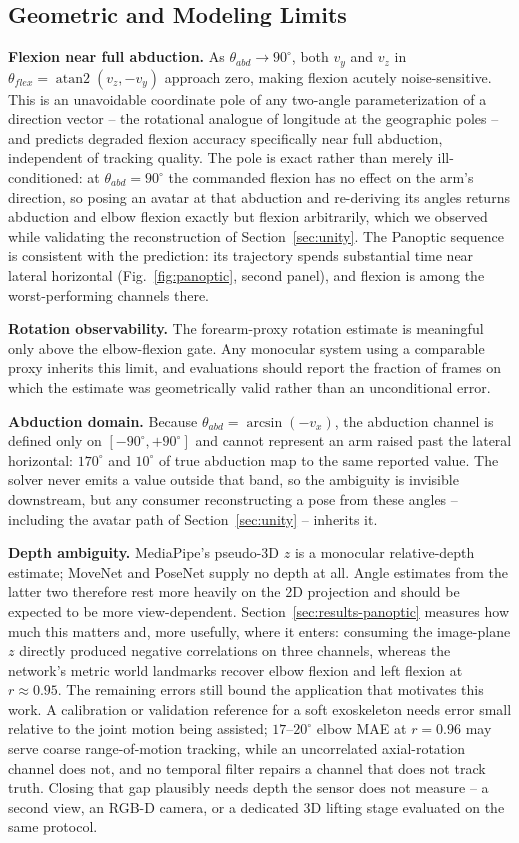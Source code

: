 \documentclass[conference]{IEEEtran}
\begin{document}
\subsection{Geometric and Modeling Limits}
\textbf{Flexion near full abduction.} As $\theta_{abd}\to90^\circ$, both
$v_y$ and $v_z$ in $\theta_{flex}=\operatorname{atan2}(v_z,-v_y)$
approach zero, making flexion acutely noise-sensitive. This is an
unavoidable coordinate pole of any two-angle parameterization of a
direction vector -- the rotational analogue of longitude at the
geographic poles -- and predicts degraded flexion accuracy specifically
near full abduction, independent of tracking quality. The pole is exact
rather than merely ill-conditioned: at $\theta_{abd}=90^\circ$ the
commanded flexion has no effect on the arm's direction, so posing an
avatar at that abduction and re-deriving its angles returns abduction and
elbow flexion exactly but flexion arbitrarily, which we observed while
validating the reconstruction of Section~\ref{sec:unity}. The Panoptic
sequence is consistent with the prediction: its trajectory spends
substantial time near lateral horizontal
(Fig.~\ref{fig:panoptic}, second panel), and flexion is among the
worst-performing channels there.

\textbf{Rotation observability.} The forearm-proxy rotation estimate is
meaningful only above the elbow-flexion gate. Any monocular system using
a comparable proxy inherits this limit, and evaluations should report the
fraction of frames on which the estimate was geometrically valid rather
than an unconditional error.

\textbf{Abduction domain.} Because $\theta_{abd}=\arcsin(-v_x)$, the
abduction channel is defined only on $[-90^\circ,+90^\circ]$ and cannot
represent an arm raised past the lateral horizontal: $170^\circ$ and
$10^\circ$ of true abduction map to the same reported value. The solver
never emits a value outside that band, so the ambiguity is invisible
downstream, but any consumer reconstructing a pose from these angles --
including the avatar path of Section~\ref{sec:unity} -- inherits it.

\textbf{Depth ambiguity.} MediaPipe's pseudo-3D $z$ is a monocular
relative-depth estimate; MoveNet and PoseNet supply no depth at all.
Angle estimates from the latter two therefore rest more heavily on the 2D
projection and should be expected to be more view-dependent. Section~\ref{sec:results-panoptic} measures how much this matters and,
more usefully, where it enters: consuming the image-plane $z$ directly
produced negative correlations on three channels, whereas the network's
metric world landmarks recover elbow flexion and left flexion at
$r\approx0.95$. The remaining errors still bound the application that
motivates this work. A calibration or validation reference for a soft
exoskeleton needs error small relative to the joint motion being
assisted; $17$--$20^\circ$ elbow MAE at $r=0.96$ may serve coarse
range-of-motion tracking, while an uncorrelated axial-rotation channel
does not, and no temporal filter repairs a channel that does not track
truth. Closing that gap plausibly needs depth the sensor does not
measure -- a second view, an RGB-D camera, or a dedicated 3D lifting
stage evaluated on the same protocol.
\end{document}
